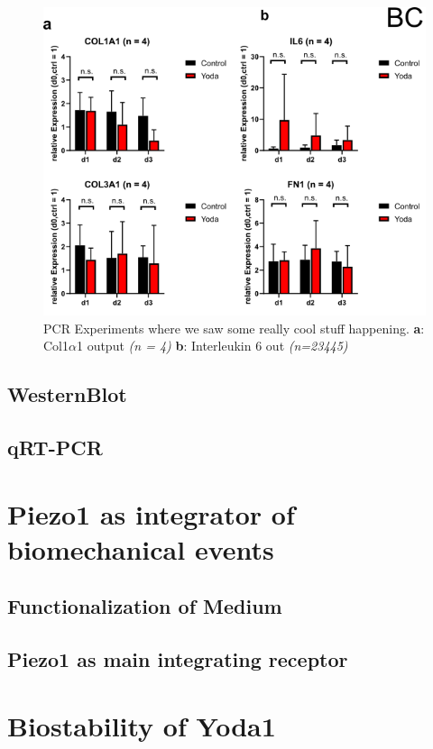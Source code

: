 \begin{figure}[h!]
    \centering
    \includegraphics[scale = 0.6]{Collection.png}
    \caption{
    PCR Experiments where we saw some really cool stuff happening. 
    \textbf{a}: Col1$\alpha$1 output \textit{(n = 4)}
    \textbf{b}: Interleukin 6 out \textit{(n=23445)}
    }
    \label{fig:my_label}
\end{figure}

\subsection{WesternBlot}

\kant[35]

\subsection{qRT-PCR}

\section{Piezo1 as integrator of biomechanical events}
\subsection{Functionalization of Medium}
\subsection{Piezo1 as main integrating receptor}

\section{Biostability of Yoda1}
\kant[42][1-3]